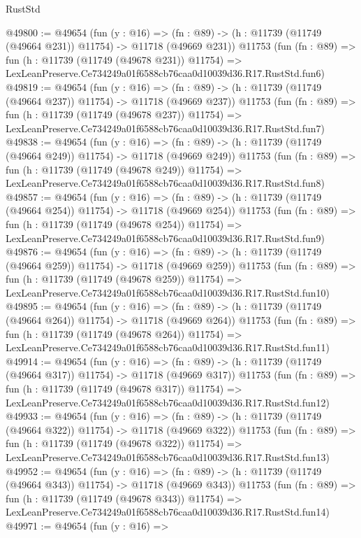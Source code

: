 \begin{lexlean}{RustStd}
\begin{coremodule}
@49800 := @49654
    (fun (y : @16) =>
    (fn : @89) -> (h : @11739 (@11749 (@49664 @231)) @11754) -> @11718 (@49669 @231))
    @11753
    (fun (fn : @89) =>
    fun (h : @11739 (@11749 (@49678 @231)) @11754) =>
    LexLeanPreserve.Ce734249a01f6588cb76caa0d10039d36.R17.RustStd.fun6)
@49819 := @49654
    (fun (y : @16) =>
    (fn : @89) -> (h : @11739 (@11749 (@49664 @237)) @11754) -> @11718 (@49669 @237))
    @11753
    (fun (fn : @89) =>
    fun (h : @11739 (@11749 (@49678 @237)) @11754) =>
    LexLeanPreserve.Ce734249a01f6588cb76caa0d10039d36.R17.RustStd.fun7)
@49838 := @49654
    (fun (y : @16) =>
    (fn : @89) -> (h : @11739 (@11749 (@49664 @249)) @11754) -> @11718 (@49669 @249))
    @11753
    (fun (fn : @89) =>
    fun (h : @11739 (@11749 (@49678 @249)) @11754) =>
    LexLeanPreserve.Ce734249a01f6588cb76caa0d10039d36.R17.RustStd.fun8)
@49857 := @49654
    (fun (y : @16) =>
    (fn : @89) -> (h : @11739 (@11749 (@49664 @254)) @11754) -> @11718 (@49669 @254))
    @11753
    (fun (fn : @89) =>
    fun (h : @11739 (@11749 (@49678 @254)) @11754) =>
    LexLeanPreserve.Ce734249a01f6588cb76caa0d10039d36.R17.RustStd.fun9)
@49876 := @49654
    (fun (y : @16) =>
    (fn : @89) -> (h : @11739 (@11749 (@49664 @259)) @11754) -> @11718 (@49669 @259))
    @11753
    (fun (fn : @89) =>
    fun (h : @11739 (@11749 (@49678 @259)) @11754) =>
    LexLeanPreserve.Ce734249a01f6588cb76caa0d10039d36.R17.RustStd.fun10)
@49895 := @49654
    (fun (y : @16) =>
    (fn : @89) -> (h : @11739 (@11749 (@49664 @264)) @11754) -> @11718 (@49669 @264))
    @11753
    (fun (fn : @89) =>
    fun (h : @11739 (@11749 (@49678 @264)) @11754) =>
    LexLeanPreserve.Ce734249a01f6588cb76caa0d10039d36.R17.RustStd.fun11)
@49914 := @49654
    (fun (y : @16) =>
    (fn : @89) -> (h : @11739 (@11749 (@49664 @317)) @11754) -> @11718 (@49669 @317))
    @11753
    (fun (fn : @89) =>
    fun (h : @11739 (@11749 (@49678 @317)) @11754) =>
    LexLeanPreserve.Ce734249a01f6588cb76caa0d10039d36.R17.RustStd.fun12)
@49933 := @49654
    (fun (y : @16) =>
    (fn : @89) -> (h : @11739 (@11749 (@49664 @322)) @11754) -> @11718 (@49669 @322))
    @11753
    (fun (fn : @89) =>
    fun (h : @11739 (@11749 (@49678 @322)) @11754) =>
    LexLeanPreserve.Ce734249a01f6588cb76caa0d10039d36.R17.RustStd.fun13)
@49952 := @49654
    (fun (y : @16) =>
    (fn : @89) -> (h : @11739 (@11749 (@49664 @343)) @11754) -> @11718 (@49669 @343))
    @11753
    (fun (fn : @89) =>
    fun (h : @11739 (@11749 (@49678 @343)) @11754) =>
    LexLeanPreserve.Ce734249a01f6588cb76caa0d10039d36.R17.RustStd.fun14)
@49971 := @49654
    (fun (y : @16) =>

\end{coremodule}
\end{lexlean}
